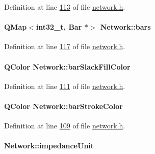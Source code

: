 Definition at line \hyperlink{network_8h_source_l00113}{113} of file \hyperlink{network_8h_source}{network.\+h}.

\hypertarget{class_network_a7fe628f7de34a96235cbd3f2cee4aff2}{}
\paragraph[{bars}]{\setlength{\rightskip}{0pt plus 5cm}Q\+Map$<$int32\+\_\+t, {\bf Bar} $\ast$$>$ Network\+::bars}\label{class_network_a7fe628f7de34a96235cbd3f2cee4aff2}


Definition at line \hyperlink{network_8h_source_l00117}{117} of file \hyperlink{network_8h_source}{network.\+h}.

\hypertarget{class_network_ad78d9a206daf4ba0780067b5043c7f5c}{}
\paragraph[{bar\+Slack\+Fill\+Color}]{\setlength{\rightskip}{0pt plus 5cm}Q\+Color Network\+::bar\+Slack\+Fill\+Color}\label{class_network_ad78d9a206daf4ba0780067b5043c7f5c}


Definition at line \hyperlink{network_8h_source_l00111}{111} of file \hyperlink{network_8h_source}{network.\+h}.

\hypertarget{class_network_ad69052271ab0a9899948815b6201f2c6}{}
\paragraph[{bar\+Stroke\+Color}]{\setlength{\rightskip}{0pt plus 5cm}Q\+Color Network\+::bar\+Stroke\+Color}\label{class_network_ad69052271ab0a9899948815b6201f2c6}


Definition at line \hyperlink{network_8h_source_l00109}{109} of file \hyperlink{network_8h_source}{network.\+h}.

\hypertarget{class_network_a5f3d72699a723c64a89d22e34df708ff}{}
\paragraph[{impedance\+Unit}]{ Network\+::impedance\+Unit\hspace{0.3cm}{\ttfamily [static]}}\label{class_network_a5f3d72699a723c64a89d22e34df708ff}



